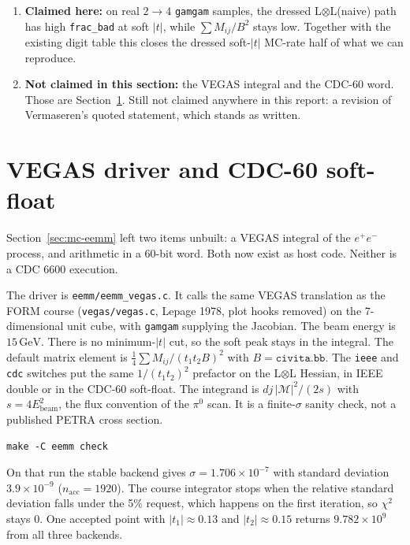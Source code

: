 \documentclass[11pt]{article}
\begin{document}
\begin{enumerate}
  \item \textbf{Claimed here:} on real $2\to4$ \texttt{gamgam} samples,
    the dressed L$\otimes$L(naive) path has high \texttt{frac\_bad} at
    soft $|t|$, while $\sum M_{ij}/B^2$ stays low. Together with the
    existing digit table this closes the dressed soft-$|t|$ MC-rate
    half of what we can reproduce.
  \item \textbf{Not claimed in this section:} the VEGAS integral and
    the CDC-60 word. Those are Section~\ref{sec:vegas-cdc}. Still not
    claimed anywhere in this report: a revision of Vermaseren's quoted
    statement, which stands as written.
\end{enumerate}

\section{VEGAS driver and CDC-60 soft-float}
\label{sec:vegas-cdc}

Section~\ref{sec:mc-eemm} left two items unbuilt: a VEGAS integral of
the $e^+e^-$ process, and arithmetic in a 60-bit word. Both now exist
as host code. Neither is a CDC 6600 execution.

The driver is \texttt{eemm/eemm\_vegas.c}. It calls the same VEGAS
translation as the FORM course (\texttt{vegas/vegas.c}, Lepage 1978,
plot hooks removed) on the 7-dimensional unit cube, with
\texttt{gamgam} supplying the Jacobian. The beam energy is
$15\,\mathrm{GeV}$. There is no minimum-$|t|$ cut, so the soft peak
stays in the integral. The default matrix element is
$\tfrac14\sum M_{ij}/(t_1 t_2 B)^2$ with $B=\texttt{civita.bb}$.
The \texttt{ieee} and \texttt{cdc} switches put the same
$1/(t_1 t_2)^2$ prefactor on the L$\otimes$L Hessian, in IEEE double
or in the CDC-60 soft-float. The integrand is $dj\,|\mathcal M|^2/(2s)$
with $s=4 E_{\mathrm{beam}}^2$, the flux convention of the $\pi^0$
scan. It is a finite-$\sigma$ sanity check, not a published PETRA
cross section.

\begin{verbatim}
make -C eemm check
\end{verbatim}

On that run the stable backend gives
$\sigma=1.706\times 10^{-7}$ with standard deviation
$3.9\times 10^{-9}$ ($n_{\mathrm{acc}}=1920$). The course integrator
stops when the relative standard deviation falls under the 5\%
request, which happens on the first iteration, so $\chi^2$ stays 0.
One accepted point with $|t_1|\approx 0.13$ and $|t_2|\approx 0.15$
returns $9.782\times 10^{9}$ from all three backends.
\end{document}
